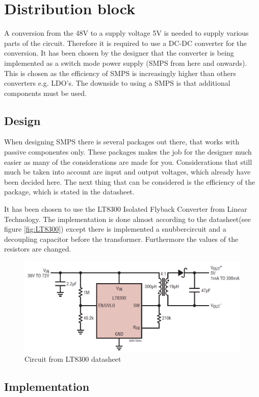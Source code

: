 \newpage
\section{Distribution block}
\label{sec:SMPS}
A conversion from the 48V to a supply voltage 5V is needed to supply various parts of the circuit. Therefore it is required to use a DC-DC converter for the conversion. It has been chosen by the designer that the converter is being implemented as a switch mode power supply (SMPS from here and onwards). This is chosen as the efficiency of SMPS is increasingly higher than others converters e.g. LDO's. The downside to using a SMPS is that additional components must be used.  

\subsection{Design}

When designing SMPS there is several packages out there, that works with passive componentes only. These packages makes the job for the designer much easier as many of the considerations are made for you. Considerations that still much be taken into account are input and output voltages, which already have been decided here. The next thing that can be considered is the efficiency of the package, which is stated in the datasheet.

It has been chosen to use the LT8300 Isolated Flyback Converter from Linear Technology. The implementation is done almost according to the datasheet(see figure \vref{fig:LT8300}) \cite{LT8300} except there is implemented a snubbercircuit and a decoupling capacitor before the transformer. Furthermore the values of the resistors are changed.  \\

\begin{figure}[H]
	\centering
	\includegraphics[width=0.6\linewidth]{Hardware/Pictures/LT8300_circuit}
	\caption{Circuit from LT8300 datasheet}
	\label{fig:LT8300}
\end{figure}

\subsection{Implementation}

